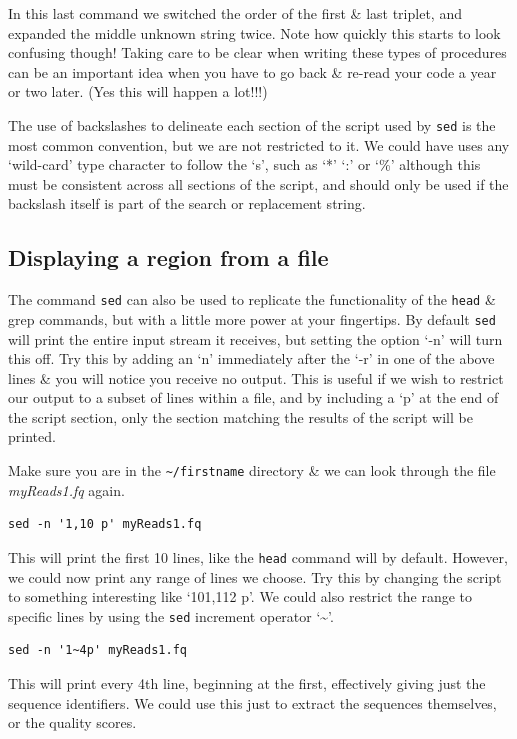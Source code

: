 \documentclass[a4paper,12pt,twoside]{memoir}
\begin{document}
In this last command we switched the order of the first \& last triplet, and expanded the middle unknown string twice.
Note how quickly this starts to look confusing though!
Taking care to be clear when writing these types of procedures can be an important idea when you have to go back \& re-read your code a year or two later.
(Yes this will happen a lot!!!)

\begin{information}
The use of backslashes to delineate each section of the script used by \texttt{sed} is the most common convention, but we are not restricted to it.
We could have uses any `wild-card' type character to follow the `s', such as `*' `:' or `\%' although this must be consistent across all sections of the script, and should only be used if the backslash itself is part of the search or replacement string.
\end{information}

\subsection*{Displaying a region from a file}
The command \texttt{sed} can also be used to replicate the functionality of the \texttt{head} \& grep commands, but with a little more power at your fingertips.
By default \texttt{sed} will print the entire input stream it receives, but setting the option `-n' will turn this off.
Try this by adding an `n' immediately after the `-r' in one of the above lines \& you will notice you receive no output.
This is useful if we wish to restrict our output to a subset of lines within a file, and by including a `p' at the end of the script section, only the section matching the results of the script will be printed.
\begin{steps}
Make sure you are in the \texttt{\~{}/firstname} directory \& we can look through the file \textit{myReads1.fq} again.
\begin{lstlisting}
sed -n '1,10 p' myReads1.fq
\end{lstlisting}
This will print the first 10 lines, like the \texttt{head} command will by default.
However, we could now print any range of lines we choose.
Try this by changing the script to something interesting like `101,112 p'.
We could also restrict the range to specific lines by using the \texttt{sed} increment operator `\~{}'.
\begin{lstlisting}
sed -n '1~4p' myReads1.fq
\end{lstlisting}
This will print every 4th line, beginning at the first, effectively giving just the sequence identifiers.
We could use this just to extract the sequences themselves, or the quality scores.
\end{steps}
\end{document}
